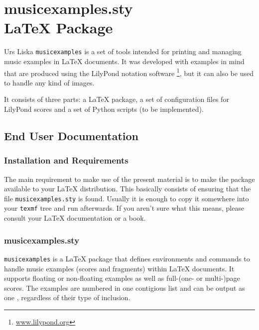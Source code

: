 \documentclass[../openLilyLib]{subfiles}
\begin{document}
\part{musicexamples.sty\\\LaTeX{} Package}


\begin{authorAbstract}{Urs Liska}
\texttt{musicexamples} is a set of tools intended for printing and managing music examples in \LaTeX{} documents.
It was developed with examples in mind that are produced using the LilyPond notation software%
\footnote{\url{www.lilypond.org}},
but it can also be used to handle any kind of images.

It consists of three parts: a \LaTeX{} package, a set of configuration files for LilyPond scores and a set of Python scripts (to be implemented).
\end{authorAbstract}

\vfill


\tableofcontents

\chapter{End User Documentation}
\section{Installation and Requirements}
The main requirement to make use of the present material is to make the  package available to your \LaTeX{} distribution.
This basically consists of ensuring that the file \texttt{musicexamples.sty} is found.
Usually it is enough to copy it somewhere into your \texttt{texmf} tree and run  afterwards.
If you aren't sure what this means, please consult your \LaTeX{} documentation or a book.



\section{musicexamples.sty}
\label{sec:xmp_musicexamples}

\texttt{musicexamples} is a \LaTeX{} package that defines environments and commands to handle music examples (scores and fragments) within \LaTeX{} documents.
It supports floating or non-floating examples as well as full-(one- or multi-)page scores.
The examples are numbered in one contigious list and can be output as one , regardless of their type of inclusion.
\end{document}
